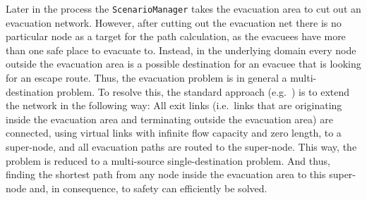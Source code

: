 Later in the process the \lstinline+ScenarioManager+ takes the evacuation area to cut out an evacuation network. However, after cutting out the evacuation net there is no particular node as a target for the path
calculation, as the evacuees have more than one safe place to evacuate to. Instead,
in the underlying domain every node outside the evacuation area is a possible
destination for an evacuee that is looking for an escape route. Thus, the evacuation problem is in general a multi-destination problem. To resolve this,
the standard approach (e.g.~\citet{FordFulkerson1962FlowsInNetworks,LuGeorgeEtAl2005CapacityConstrainedRouting})
is to extend the network in the following way: All exit links (i.e.\ links that are originating inside the evacuation area and terminating outside the evacuation area) are connected, using virtual links with infinite flow capacity
and zero length, to a super-node, and all evacuation paths are routed to the super-node. This way, the problem is reduced to a multi-source single-destination problem. And thus, finding the shortest path from any node inside the evacuation area to this super-node and, in consequence, to safety can efficiently be solved.


